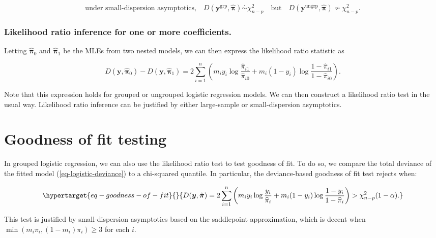 \documentclass[
  11pt,
  letterpaper,
  oneside]{book}
\theoremstyle{definition}
\theoremstyle{plain}
\theoremstyle{plain}
\theoremstyle{plain}
\theoremstyle{remark}
\begin{document}
\[
\text{under small-dispersion asymptotics,} \quad D(\boldsymbol y^{\text{grp}}, \hat{\boldsymbol \pi}) \overset \cdot \sim \chi^2_{n-p} \quad \text{but} \quad D(\boldsymbol y^{\text{ungrp}}, \hat{\boldsymbol \pi}) \not \sim \chi^2_{n-p}.
\]

\hypertarget{sec-likelihood-ratio-test}{%
\subsubsection{Likelihood ratio inference for one or more
coefficients.}\label{sec-likelihood-ratio-test}}

Letting \(\boldsymbol{\widehat \pi}_0\) and
\(\boldsymbol{\widehat \pi}_1\) be the MLEs from two nested models, we
can then express the likelihood ratio statistic as

\[
D(\boldsymbol y, \boldsymbol{\widehat \pi}_0) - D(\boldsymbol y, \boldsymbol{\widehat \pi}_1) = 2\sum_{i = 1}^n \left(m_i y_i \log \frac{\widehat \pi_{i1}}{\widehat \pi_{i0}} + m_i(1-y_i) \log\frac{1-\widehat \pi_{i1}}{1-\widehat \pi_{i0}}\right).
\]

Note that this expression holds for grouped or ungrouped logistic
regression models. We can then construct a likelihood ratio test in the
usual way. Likelihood ratio inference can be justified by either
large-sample or small-dispersion asymptotics.

\hypertarget{sec-goodness-of-fit}{%
\section{Goodness of fit testing}\label{sec-goodness-of-fit}}

In grouped logistic regression, we can also use the likelihood ratio
test to test goodness of fit. To do so, we compare the total deviance of
the fitted model (\ref{eq-logistic-deviance}) to a chi-squared quantile.
In particular, the deviance-based goodness of fit test rejects when:

\begin{equation}\protect\hypertarget{eq-goodness-of-fit}{}{
D(\boldsymbol{y}, \hat{\boldsymbol{\pi}}) = 2\sum_{i = 1}^n \left(m_i y_i \log \frac{y_i}{\widehat \pi_i} + m_i(1-y_i) \log\frac{1-y_i}{1-\widehat \pi_i}\right) > \chi^2_{n-p}(1-\alpha).
}\label{eq-goodness-of-fit}\end{equation}

This test is justified by small-dispersion asymptotics based on the
saddlepoint approximation, which is decent when
\(\min(m_i \pi_i, (1-m_i)\pi_i) \geq 3\) for each \(i\).
\end{document}
